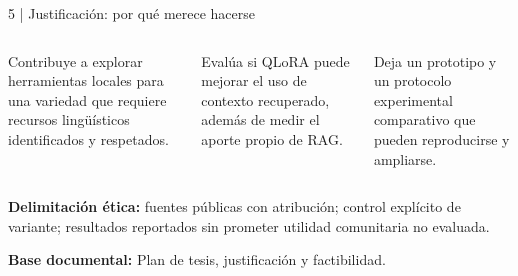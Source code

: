 \documentclass[aspectratio=169,10pt,spanish]{beamer}
\newcommand{\fuente}[1]{\vfill{\tiny\color{bpNavy!75}\textbf{Base documental:} #1}}
\begin{document}
\begin{frame}{5 | Justificación: por qué merece hacerse}
\begin{columns}[T,onlytextwidth]
\begin{tcolorbox}[colback=bpLightGray,colframe=bpRust,title={Lingüística y social}]
Contribuye a explorar herramientas locales para una variedad que requiere recursos lingüísticos identificados y respetados.
\end{tcolorbox}
\begin{tcolorbox}[colback=bpLightGray,colframe=bpBlue,title={Técnica}]
Evalúa si QLoRA puede mejorar el uso de contexto recuperado, además de medir el aporte propio de RAG.
\end{tcolorbox}
\begin{tcolorbox}[colback=bpLightGray,colframe=bpGold,title={Práctica y académica}]
Deja un prototipo y un protocolo experimental comparativo que pueden reproducirse y ampliarse.
\end{tcolorbox}
\end{columns}
\vspace{0.28cm}
\begin{tcolorbox}[colback=white,colframe=bpNavy]
\centering\small\textbf{Delimitación ética:} fuentes públicas con atribución; control explícito de variante; resultados reportados sin prometer utilidad comunitaria no evaluada.
\end{tcolorbox}
\fuente{Plan de tesis, justificación y factibilidad.}
\end{frame}
\end{document}
